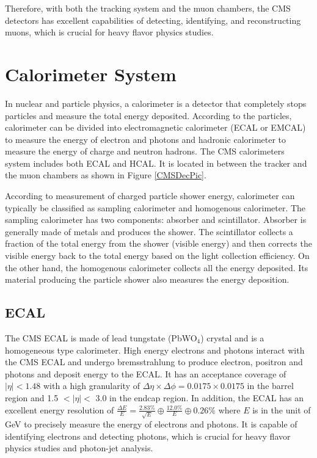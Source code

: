 Therefore, with both the tracking system and the muon chambers, the CMS detectors has excellent capabilities of detecting, identifying, and reconstructing muons, which is crucial for heavy flavor physics studies.

\section{Calorimeter System}

In nuclear and particle physics, a calorimeter is a detector that completely stops particles and measure the total energy deposited. According to the particles, calorimeter can be divided into electromagnetic calorimeter (ECAL or EMCAL) to measure the energy of electron and photons and hadronic calorimeter to measure the energy of charge and neutron hadrons. The CMS calorimeters system includes both ECAL and HCAL. It is located in between the tracker and the muon chambers as shown in Figure \ref{CMSDecPic}. 

According to measurement of charged particle shower energy, calorimeter can typically be classified as sampling calorimeter and homogenous calorimeter. The sampling calorimeter has two components: absorber and scintillator. Absorber is generally made of metals and produces the shower. The scintillator collects a fraction of the total energy from the shower (visible energy) and then corrects the visible energy back to the total energy based on the light collection efficiency. On the other hand, the homogenous calorimeter collects all the energy deposited. Its material producing the particle shower also measures the energy deposition. 

\subsection{ECAL}

The CMS ECAL is made of lead tungstate (PbWO$_4$) crystal and is a homogeneous type calorimeter. High energy electrons and photons interact with the CMS ECAL and undergo bremsstrahlung to produce electron, positron and photons and deposit energy to the ECAL. It has an acceptance coverage of $|\eta| < 1.48$ with a high granularity of $\Delta \eta \times \Delta \phi = 0.0175 \times 0.0175$ in the barrel region and 1.5 $< |\eta| <$ 3.0 in the endcap region. In addition, the ECAL has an excellent energy resolution of $\frac{\Delta E}{E} = \frac{2.83\%}{\sqrt {E}} \oplus \frac{12.0\%}{E}  \oplus 0.26\%$ where $E$ is in the unit of GeV \cite{ECALReso} to precisely measure the energy of electrons and photons. It is capable of identifying electrons and detecting photons, which is crucial for heavy flavor physics studies and photon-jet analysis. 

